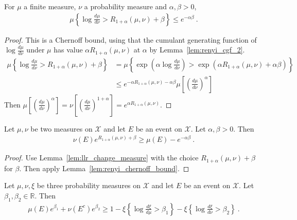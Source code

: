 \begin{lemma}
  \label{lem:renyi_chernoff_bound}
  \leanok
  For $\mu$ a finite measure, $\nu$ a probability measure and $\alpha, \beta > 0$,
  \begin{align*}
  \mu\left\{ \log\frac{d \mu}{d \nu} > R_{1+\alpha}(\mu, \nu) + \beta \right\}
  \le e^{- \alpha \beta}
  \: .
  \end{align*}
\end{lemma}

\begin{proof}\leanok
{}
This is a Chernoff bound, using that the cumulant generating function of $\log\frac{d\mu}{d\nu}$ under $\mu$ has value $\alpha R_{1+\alpha}(\mu, \nu)$ at $\alpha$ by Lemma~\ref{lem:renyi_cgf_2}.
\begin{align*}
\mu\left\{ \log\frac{d \mu}{d \nu} > R_{1+\alpha}(\mu, \nu) + \beta \right\}
&= \mu\left\{ \exp\left(\alpha\log\frac{d \mu}{d \nu}\right) > \exp\left(\alpha R_{1+\alpha}(\mu, \nu) + \alpha \beta\right) \right\}
\\
&\le e^{-\alpha R_{1+\alpha}(\mu, \nu) - \alpha \beta} \mu\left[\left(\frac{d \mu}{d \nu}\right)^\alpha \right]
\end{align*}
Then $\mu\left[\left(\frac{d \mu}{d \nu}\right)^\alpha \right] = \nu\left[\left(\frac{d \mu}{d \nu}\right)^{1+\alpha} \right] = e^{\alpha R_{1+\alpha}(\mu, \nu)}$.
\end{proof}

\begin{lemma}
  \label{lem:renyi_change_measure}
  \leanok
  Let $\mu, \nu$ be two measures on $\mathcal X$ and let $E$ be an event on $\mathcal X$. Let $\alpha,\beta > 0$. Then
  \begin{align*}
  \nu(E) e^{R_{1+\alpha}(\mu, \nu) + \beta} \ge \mu(E) - e^{-\alpha \beta} \: .
  \end{align*}
\end{lemma}

\begin{proof}\leanok
{}
Use Lemma~\ref{lem:llr_change_measure} with the choice $R_{1+\alpha}(\mu, \nu) + \beta$ for $\beta$. Then apply Lemma~\ref{lem:renyi_chernoff_bound}.
\end{proof}

\begin{lemma}
  \label{lem:llr_change_measure_add}
  \leanok
  Let $\mu, \nu, \xi$ be three probability measures on $\mathcal X$ and let $E$ be an event on $\mathcal X$. Let $\beta_1, \beta_2 \in \mathbb{R}$. Then
  \begin{align*}
  \mu(E) e^{\beta_1} + \nu(E^c) e^{\beta_2} \ge 1 - \xi\left\{ \log\frac{d \xi}{d \mu} > \beta_1 \right\} - \xi\left\{ \log\frac{d \xi}{d \nu} > \beta_2 \right\} \: .
  \end{align*}
\end{lemma}

